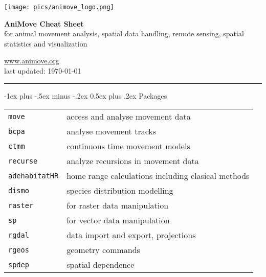 \documentclass[a4paper,10pt,landscape]{article}
\makeatletter
\renewcommand{\section}{\@startsection{section}{1}{0mm}%
                                {-1ex plus -.5ex minus -.2ex}%
                                {0.5ex plus .2ex}%
                                {\normalfont\large\bfseries}}
\makeatother
\begin{document}
\newlength{\MyLen}


\raggedright
\footnotesize
\begin{multicols}{3}


\setlength{\premulticols}{1pt}
\setlength{\postmulticols}{1pt}
\setlength{\multicolsep}{1pt}
\setlength{\columnsep}{2pt}
  
\begin{center}
	 \texttt{[image: pics/animove\_logo.png]}
     
     \Large{\textbf{AniMove Cheat Sheet}} \\
     for animal movement analysis, spatial data handling, remote sensing, spatial statistics and visualization
     
\end{center}



\url{www.animove.org}\\
last updated: \today

\rule{0.32\textwidth}{0.4pt}


\section{Packages}
\begin{tabular}{@{}p{\the\MyLen}%
		@{}p{\linewidth-\the\MyLen}@{}}
\verb!move!  & access and analyse movement data\\
\verb!bcpa!  & analyse movement tracks\\
\verb!ctmm!  &  continuous time movement models\\
\verb!recurse!  & analyze recursions in movement data\\
\verb!adehabitatHR! & home range calculations including clasical methods\\
\verb!dismo!  &  species distribution modelling \\
\verb!raster!    & for raster data manipulation \\
\verb!sp!     & for vector data manipulation \\
\verb!rgdal!  & data import and export, projections \\
\verb!rgeos!  & geometry commands \\
\verb!spdep!  & spatial dependence \\


\end{tabular}
\end{multicols}
\end{document}
